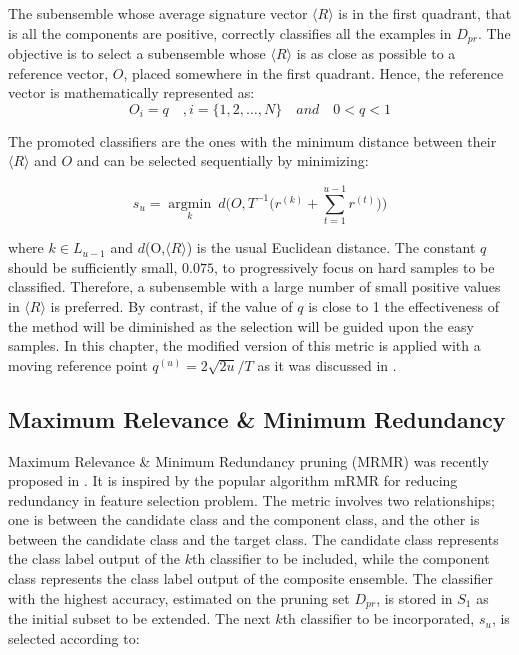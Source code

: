The subensemble whose average signature vector $\langle R \rangle$ is in the first quadrant, that is all the components are positive, correctly classifies all the examples in $D_{pr}$. The objective is to select a subensemble whose $\langle R \rangle$ is as close as possible to a reference vector, $O$, placed somewhere in the first quadrant. Hence, the reference vector is mathematically represented as: 
\begin{equation}
\label{reference.vec}
O_i= q\quad ,i=\{1,2,\dots,N\} \quad  and \quad 0<q<1  
\end{equation}

The promoted classifiers are the ones with the minimum distance between their $\langle R \rangle$ and $O$ and can be selected sequentially by minimizing:

\begin{equation}
\label{margin.distance}
s_u=\mathop{\arg\min}\limits_{k}\:  d\Bigg(O, T^{-1}\Bigg(r^{(k)}+ \mathop{\sum}\limits_{t=1}^{u-1} r^{(t)}\Bigg) \Bigg)
\end{equation}

\noindent where $k \in L_{u-1}$ and $d$(O,$\langle R \rangle$) is the usual Euclidean distance. The constant $q$ should be sufficiently small, $0.075$, to progressively focus on hard samples to be classified. Therefore, a subensemble with a large number of small positive values in $\langle R \rangle$  is preferred. By contrast, if the value of $q$ is close to 1 the effectiveness of the method will be diminished as the selection will be guided upon the easy samples. In this chapter, the modified version of this metric is applied with a moving reference point $q^{(u)}=2 \sqrt{2u}\big/T$ as it was discussed in \cite{martinez2009}. 
 
 \subsection{Maximum Relevance \&  Minimum Redundancy} \label{ch6_MRMR}
Maximum Relevance \& Minimum Redundancy pruning (MRMR) was recently proposed in \cite{cao2018}. It is inspired by the popular algorithm mRMR \cite{sakar2012,unler2011} for reducing redundancy in feature selection problem. The metric involves two relationships; one is between the candidate class and the component class, and the other is between the candidate class and the target class. The candidate class represents the class label output of the $k$th classifier to be included, while the component class represents the class label output of the composite ensemble. The classifier with the highest accuracy, estimated on the pruning set $D_{pr}$, is stored in $S_1$ as the initial subset to be extended. The next $k$th classifier to be incorporated, $s_u$, is selected according to:        



